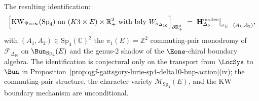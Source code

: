\begin{proposition}
The resulting identification:
\[
 \Bigl[\text{KW}_{\Psi=\infty}(\mathrm{Sp}_4)\text{ on }(K3\times E)\times\mathbb R_+^2
 \text{ with bdy }W_{\sigma_{\Delta_{10}}}\Bigr]_{\partial\mathbb R_+^2}
 \;=\;\mathbf H_{\Delta_5}^{\text{modes}}\big|_{\sigma_E=(A_1,A_2)},
\]
with $(A_1,A_2)\in\mathrm{Sp}_4(\mathbb C)^2$ the $\pi_1(E)=\mathbb Z^2$
commuting-pair monodromy of $\mathcal F_{\Delta_{10}}$ on
$\Bun_{\mathrm{Sp}_4}(E)$ and the genus-$2$ shadow of the
$\Eone$-chiral boundary algebra. The identification is conjectural only
on the transport from $\LocSys$ to $\Bun$ in
Proposition~\ref{prop:qgf-gaitsgory-lurie-sp4-delta10-bnp-action}(iv);
the commuting-pair
structure, the character variety $\mathcal M_{\mathrm{Sp}_4}(E)$, and
the KW boundary mechanism are unconditional.
\end{proposition}

